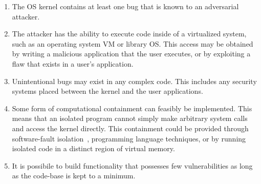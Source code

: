 \begin{enumerate}
\item The OS kernel contains at least one bug that is known to an adversarial attacker.

\item The attacker has the ability to execute code inside
of a virtualized system, such as an operating system VM or library OS.
This access may be obtained by writing a malicious application
that the user executes, or by exploiting a flaw that exists in a user's
application.

\item Unintentional bugs may exist in any complex code. This
includes any security systems placed between the kernel and the user
applications.

\item Some form of computational containment can feasibly be implemented.
This means that an isolated program cannot simply
make arbitrary system calls and access the kernel directly. This containment could
be provided through software-fault isolation~\cite{SFI:93}, programming
language techniques, or by running isolated code in a
distinct region of virtual memory.

\item It is possibile to build functionality that possesses few
vulnerabilities as long as the code-base is kept to a minimum.


\end{enumerate}

